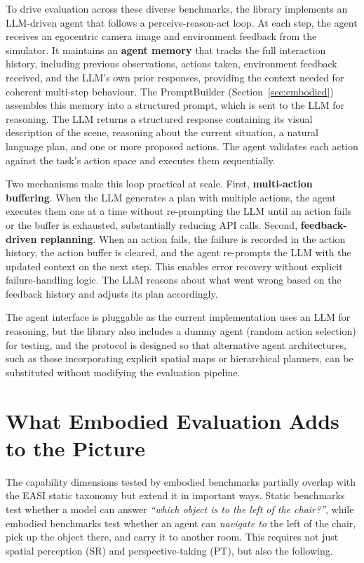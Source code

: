 To drive evaluation across these diverse benchmarks, the library implements an LLM-driven agent that follows a perceive-reason-act loop. At each step, the agent receives an egocentric camera image and environment feedback from the simulator. It maintains an \textbf{agent memory} that tracks the full interaction history, including previous observations, actions taken, environment feedback received, and the LLM's own prior responses, providing the context needed for coherent multi-step behaviour. The PromptBuilder (Section~\ref{sec:embodied}) assembles this memory into a structured prompt, which is sent to the LLM for reasoning. The LLM returns a structured response containing its visual description of the scene, reasoning about the current situation, a natural language plan, and one or more proposed actions. The agent validates each action against the task's action space and executes them sequentially.

Two mechanisms make this loop practical at scale. First, \textbf{multi-action buffering}. When the LLM generates a plan with multiple actions, the agent executes them one at a time without re-prompting the LLM until an action fails or the buffer is exhausted, substantially reducing API calls. Second, \textbf{feedback-driven replanning}. When an action fails, the failure is recorded in the action history, the action buffer is cleared, and the agent re-prompts the LLM with the updated context on the next step. This enables error recovery without explicit failure-handling logic. The LLM reasons about what went wrong based on the feedback history and adjusts its plan accordingly.

The agent interface is pluggable as the current implementation uses an LLM for reasoning, but the library also includes a dummy agent (random action selection) for testing, and the protocol is designed so that alternative agent architectures, such as those incorporating explicit spatial maps or hierarchical planners, can be substituted without modifying the evaluation pipeline.

\section{What Embodied Evaluation Adds to the Picture}

The capability dimensions tested by embodied benchmarks partially overlap with the EASI static taxonomy but extend it in important ways. Static benchmarks test whether a model can answer \textit{``which object is to the left of the chair?''}, while embodied benchmarks test whether an agent can \textit{navigate to} the left of the chair, pick up the object there, and carry it to another room. This requires not just spatial perception (SR) and perspective-taking (PT), but also the following.

